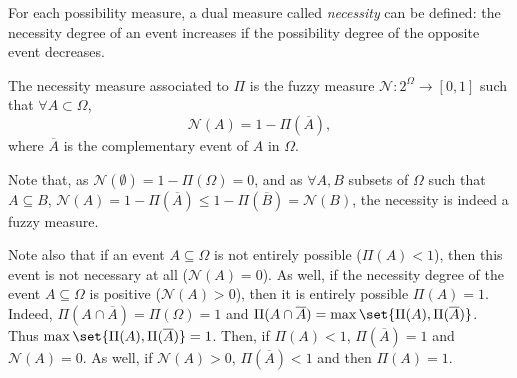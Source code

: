 For each possibility measure, a dual measure called \textit{necessity} can be defined:
the necessity degree of an event increases if the possibility degree of the opposite event decreases.
\begin{Def}
\label{DEF_necessity}
The necessity measure associated to $\Pi$ is the fuzzy measure $\mathcal{N}:2^\Omega \rightarrow [0,1]$ such that
$\forall A \subset \Omega$, \[ \mathcal{N}(A)=1-\Pi(\overline{A}), \]
where $\overline{A}$ is the complementary event of $A$ in $\Omega$.
\end{Def}
Note that, as $\mathcal{N}(\emptyset) =1 - \Pi(\Omega) = 0 $,  %
and as $\forall A,B$ subsets of $\Omega$ such that $A \subseteq B$, $\mathcal{N}(A) = 1-\Pi(\overline{A}) \leqslant 1-\Pi(\overline{B}) = \mathcal{N}(B)$,
the necessity is indeed a fuzzy measure.

Note also that if an event $A \subseteq \Omega$ 
is not entirely possible ($\Pi(A)<1$), then 
this event is not necessary at all ($\mathcal{N}(A)=0$). 
As well, if the necessity degree of the event $A \subseteq \Omega$
is positive ($\mathcal{N}(A)>0$), then it is entirely possible $\Pi(A)=1$. 
Indeed, $\Pi(A \cap \overline{A}) = \Pi(\Omega) = 1$
and $\Pi(A \cap \overline{A}) = \max \set{\Pi(A), \Pi(\overline{A})}$.
Thus $\max \set{\Pi(A), \Pi(\overline{A})} = 1$.
Then, if $\Pi(A) < 1$, $\Pi(\overline{A}) = 1$ and $\mathcal{N}(A) = 0$.
As well, if $\mathcal{N}(A)>0$, $\Pi(\overline{A})<1$ and then $\Pi(A) = 1$.

